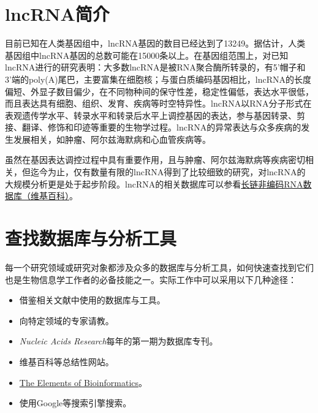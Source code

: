 \section{lncRNA简介}
目前已知在人类基因组中，lncRNA基因的数目已经达到了13249。据估计，人类基因组中lncRNA基因的总数可能在15000条以上。在基因组范围上，对已知lncRNA进行的研究表明：大多数lncRNA是被RNA聚合酶所转录的，有5'帽子和3'端的poly(A)尾巴，主要富集在细胞核；与蛋白质编码基因相比，lncRNA的长度偏短、外显子数目偏少，在不同物种间的保守性差，稳定性偏低，表达水平很低，而且表达具有细胞、组织、发育、疾病等时空特异性。lncRNA以RNA分子形式在表观遗传学水平、转录水平和转录后水平上调控基因的表达，参与基因转录、剪接、翻译、修饰和印迹等重要的生物学过程。lncRNA的异常表达与众多疾病的发生发展相关，如肿瘤、阿尔兹海默病和心血管疾病等。

虽然在基因表达调控过程中具有重要作用，且与肿瘤、阿尔兹海默病等疾病密切相关，但迄今为止，仅有数量有限的lncRNA得到了比较细致的研究，对lncRNA的大规模分析更是处于起步阶段。lncRNA的相关数据库可以参看\href{http://zh.wikipedia.org/wiki/\%E9\%95\%BF\%E9\%93\%BE\%E9\%9D\%9E\%E7\%BC\%96\%E7\%A0\%81RNA\%E6\%95\%B0\%E6\%8D\%AE\%E5\%BA\%93}{长链非编码RNA数据库（维基百科）}。

\section{查找数据库与分析工具}
每一个研究领域或研究对象都涉及众多的数据库与分析工具，如何快速查找到它们也是生物信息学工作者的必备技能之一。实际工作中可以采用以下几种途径：
\begin{itemize}
	\item 借鉴相关文献中使用的数据库与工具。
	\item 向特定领域的专家请教。
	\item \textit{Nucleic Acids Research}每年的第一期为数据库专刊。
	\item 维基百科等总结性网站。
	\item \href{http://elements.eaglegenomics.com/}{The Elements of Bioinformatics}。
	\item 使用Google等搜索引擎搜索。
\end{itemize}

